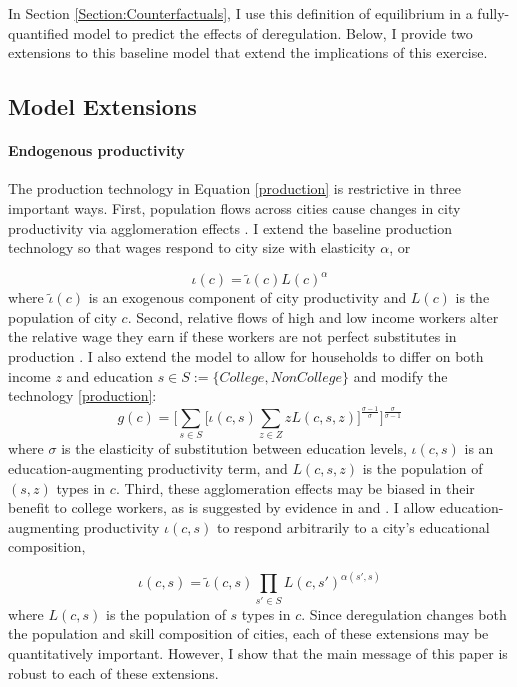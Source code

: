 \documentclass[12pt]{article}
\begin{document}
	\noindent In Section \ref{Section:Counterfactuals}, I use this definition of equilibrium in a fully-quantified model to predict the effects of deregulation. Below, I provide two extensions to this baseline model that extend the implications of this exercise.
	
	
	\subsection{Model Extensions}
	
	\paragraph*{Endogenous productivity} The production technology in Equation \eqref{production} is restrictive in three important ways. First, population flows across cities cause changes in city productivity via agglomeration effects \citep{Combes_review}. I extend the baseline production technology so that wages respond to city size with elasticity $\alpha$, or 
	
	\begin{equation}\label{endoprod}
		\iota(c) = \tilde{\iota}(c)L(c)^{\alpha}
	\end{equation}
	where $\tilde{\iota}(c)$ is an exogenous component of city productivity and $L(c)$ is the population of city $c$. Second, relative flows of high and low income workers alter the relative wage they earn if these workers are not perfect substitutes in production \citep{card}. I also extend the model to allow for households to differ on both income $z$ and education $s \in S:= \{College, NonCollege\}$ and modify the technology \eqref{production}:
	\begin{equation}\label{prod_byskill}
		g(c) = \bigg[\sum_{s \in S}\big[\iota(c, s)\sum_{z \in Z}zL(c, s, z)\big]^{\frac{\sigma - 1}{\sigma}} \bigg]^{\frac{\sigma}{\sigma - 1}}
 	\end{equation}
	where $\sigma$ is the elasticity of substitution between education levels, $\iota(c, s)$ is an education-augmenting productivity term, and $L(c, s, z)$ is the population of $(s, z)$ types in $c$. Third, these agglomeration effects may be biased in their benefit to college workers, as is suggested by evidence in \cite{diamond2016} and \cite{ineqincreased}. I allow education-augmenting productivity $\iota(c, s)$ to respond arbitrarily to a city's educational composition,
	
	\begin{equation}\label{endoprod_byskill}
		\iota(c, s) = \tilde{\iota}(c, s)\prod_{s' \in S}L(c, s')^{\alpha(s', s)}
	\end{equation} where $L(c, s)$ is the population of $s$ types in $c$. Since deregulation changes both the population and skill composition of cities, each of these extensions may be quantitatively important. However, I show that the main message of this paper is robust to each of these extensions. 
	
\end{document}

